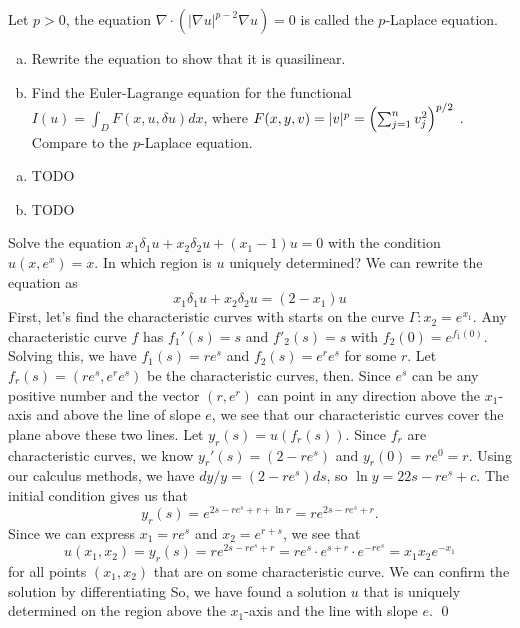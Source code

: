 \documentclass{article}
\newcommand{\D}{\nabla}
\renewcommand{\d}{\delta}
\begin{document}
\newpage
{} Let $p > 0$, the equation $\D \cdot (|\D u|^{p-2}\D u) = 0$ is called the $p$-Laplace equation.
\begin{enumerate}[(a)]
    \item Rewrite the equation to show that it is quasilinear.
    \item Find the Euler-Lagrange equation for the functional $I(u) = \int_D F (x, u, \d u)dx$, where
    $F (x, y, v) = |v|^p =
    \del{\sum^n
    _{j=1} v^2_j
    }^{p/2}$
    . Compare to the $p$-Laplace equation.
\end{enumerate}\tri
\hop
\solution
\begin{enumerate}[(a)]
    \item TODO
    \item TODO
\end{enumerate}


\newpage
{} Solve the equation $x_1\d_1u+x_2\d_2u+(x_1-1)u = 0$ with the condition $u(x, e^x) = x$.
In which region is $u$ uniquely determined?\tri
\hop
\solution We can rewrite the equation as 
\[x_1\d_1u+x_2\d_2u=(2-x_1)u\]
First, let's find the characteristic curves with starts on the curve $\Gamma: x_2 = e^{x_1}$. Any characteristic curve $f$ has $f_1'(s) = s$ and $f'_2(s) = s$ with $f_2(0)=e^{f_1(0)}$. 
\hop 
Solving this, we have $f_1(s) = re^s$ and $f_2(s) = e^re^s$ for some $r$. Let $f_r(s) = (re^s, e^re^s)$ be the characteristic curves, then. Since $e^s$ can be any positive number and the vector $(r,e^r)$ can point in any direction above the $x_1$-axis and above the line of slope $e$, we see that our characteristic curves cover the plane above these two lines.
\hop %
Let $y_r(s) = u(f_r(s))$. Since $f_r$ are characteristic curves, we know $y_r'(s)=(2-re^s)$ and $y_r(0)=re^0 = r$. Using our calculus methods, we have $dy/y = (2-re^s)ds$, so $\ln y = 22s-re^s+c$. The initial condition gives us that  
\[y_r(s)=e^{2s-re^s+r+\ln r}=re^{2s-re^s+r}.\]
Since we can express $x_1 = re^s$ and $x_2 = e^{r+s}$, we see that 
\[u(x_1,x_2) = y_r(s) = re^{2s-re^s+r} = re^s \cdot e^{s+r}\cdot e^{-re^s} = x_1x_2e^{-x_1}\]
for all points $(x_1, x_2)$ that are on some characteristic curve. We can confirm the solution by differentiating So, we have found a solution $u$ that is uniquely determined on the region above the $x_1$-axis and the line with slope $e$. \qed
\end{document}
